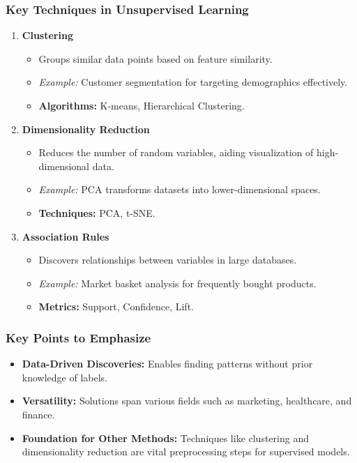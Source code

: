 \documentclass[aspectratio=169]{beamer}
\begin{document}
\begin{frame}[fragile]
    \frametitle{Key Techniques in Unsupervised Learning}
    \begin{enumerate}
        \item \textbf{Clustering}
            \begin{itemize}
                \item Groups similar data points based on feature similarity.
                \item \textit{Example:} Customer segmentation for targeting demographics effectively.
                \item \textbf{Algorithms:} K-means, Hierarchical Clustering.
            \end{itemize}
        \item \textbf{Dimensionality Reduction}
            \begin{itemize}
                \item Reduces the number of random variables, aiding visualization of high-dimensional data.
                \item \textit{Example:} PCA transforms datasets into lower-dimensional spaces.
                \item \textbf{Techniques:} PCA, t-SNE.
            \end{itemize}
        \item \textbf{Association Rules}
            \begin{itemize}
                \item Discovers relationships between variables in large databases.
                \item \textit{Example:} Market basket analysis for frequently bought products.
                \item \textbf{Metrics:} Support, Confidence, Lift.
            \end{itemize}
    \end{enumerate}
\end{frame}

\begin{frame}[fragile]
    \frametitle{Key Points to Emphasize}
    \begin{itemize}
        \item \textbf{Data-Driven Discoveries:} Enables finding patterns without prior knowledge of labels.
        \item \textbf{Versatility:} Solutions span various fields such as marketing, healthcare, and finance.
        \item \textbf{Foundation for Other Methods:} Techniques like clustering and dimensionality reduction are vital preprocessing steps for supervised models.
    \end{itemize}
\end{frame}
\end{document}
